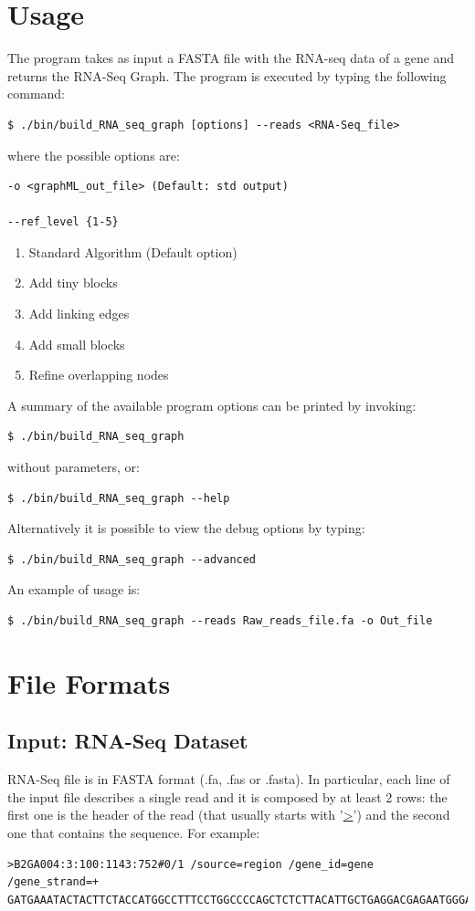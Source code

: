 \documentclass[11pt]{article}
\begin{document}
\section{Usage}
The program takes as input a FASTA file with the RNA-seq data of a
gene and returns the RNA-Seq Graph. The program is executed by typing
the following command:
\begin{verbatim}
$ ./bin/build_RNA_seq_graph [options] --reads <RNA-Seq_file>
\end{verbatim}
where the possible options are:
\begin{verbatim}
-o <graphML_out_file> (Default: std output)

--ref_level {1-5}
\end{verbatim}
\begin{enumerate}
\item Standard Algorithm (Default option)
\item Add tiny blocks
\item Add linking edges
\item Add small blocks
\item Refine overlapping nodes
\end{enumerate}
A summary of the available program options can be printed by invoking:
\begin{verbatim}
$ ./bin/build_RNA_seq_graph
\end{verbatim}
without parameters, or:
\begin{verbatim}
$ ./bin/build_RNA_seq_graph --help
\end{verbatim}
Alternatively it is possible to view the debug options by typing:
\begin{verbatim}
$ ./bin/build_RNA_seq_graph --advanced
\end{verbatim}
An example of usage is:
\begin{verbatim}
$ ./bin/build_RNA_seq_graph --reads Raw_reads_file.fa -o Out_file
\end{verbatim}

\section{File Formats}
\subsection*{Input: RNA-Seq Dataset}
RNA-Seq file is in FASTA format (.fa, .fas or .fasta). In particular,
each line of the input file describes a single read and it is composed
by at least 2 rows: the first one is the header of the read (that
usually starts with '\url{>}') and the second one that contains the
sequence. For example:
\begin{verbatim}
>B2GA004:3:100:1143:752#0/1 /source=region /gene_id=gene /gene_strand=+
GATGAAATACTACTTCTACCATGGCCTTTCCTGGCCCCAGCTCTCTTACATTGCTGAGGACGAGAATGGGAAGAT
\end{verbatim}
\end{document}
